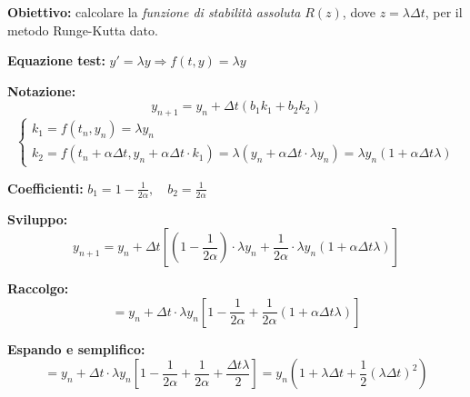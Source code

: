 \documentclass[12pt,a4paper]{article}
\begin{document}
\newpage
{}

\vspace{1em}


\textbf{Obiettivo:} calcolare la \textit{funzione di stabilità assoluta} \( R(z) \), dove \( z = \lambda \Delta t \), per il metodo Runge-Kutta dato.

\textbf{Equazione test:} \( y' = \lambda y \Rightarrow f(t, y) = \lambda y \)

\textbf{Notazione:}
\[
y_{n+1} = y_n + \Delta t \left( b_1 k_1 + b_2 k_2 \right)
\]
\[
\begin{cases}
k_1 = f(t_n, y_n) = \lambda y_n \\
k_2 = f(t_n + \alpha \Delta t, y_n + \alpha \Delta t \cdot k_1)
= \lambda \left( y_n + \alpha \Delta t \cdot \lambda y_n \right)
= \lambda y_n (1 + \alpha \Delta t \lambda)
\end{cases}
\]

\textbf{Coefficienti:} \( b_1 = 1 - \frac{1}{2\alpha}, \quad b_2 = \frac{1}{2\alpha} \)

\textbf{Sviluppo:}
\[
y_{n+1} = y_n + \Delta t \left[
\left( 1 - \frac{1}{2\alpha} \right) \cdot \lambda y_n
+ \frac{1}{2\alpha} \cdot \lambda y_n (1 + \alpha \Delta t \lambda)
\right]
\]

\textbf{Raccolgo:}
\[
= y_n + \Delta t \cdot \lambda y_n \left[
1 - \frac{1}{2\alpha} + \frac{1}{2\alpha}(1 + \alpha \Delta t \lambda)
\right]
\]

\textbf{Espando e semplifico:}
\[
= y_n + \Delta t \cdot \lambda y_n \left[
1 - \frac{1}{2\alpha} + \frac{1}{2\alpha} + \frac{\Delta t \lambda}{2}
\right]
= y_n \left( 1 + \lambda \Delta t + \frac{1}{2} (\lambda \Delta t)^2 \right)
\]
\end{document}
